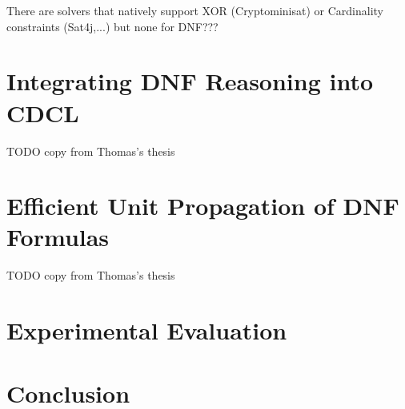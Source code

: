 \documentclass[a4paper,UKenglish,cleveref, autoref, thm-restate]{lipics-v2021}
\begin{document}
There are solvers that natively support XOR (Cryptominisat) or Cardinality constraints (Sat4j,...) but none for DNF???

\section{Integrating DNF Reasoning into CDCL}
TODO copy from Thomas's thesis

\section{Efficient Unit Propagation of DNF Formulas}
TODO copy from Thomas's thesis

\section{Experimental Evaluation}

\section{Conclusion}


\end{document}
